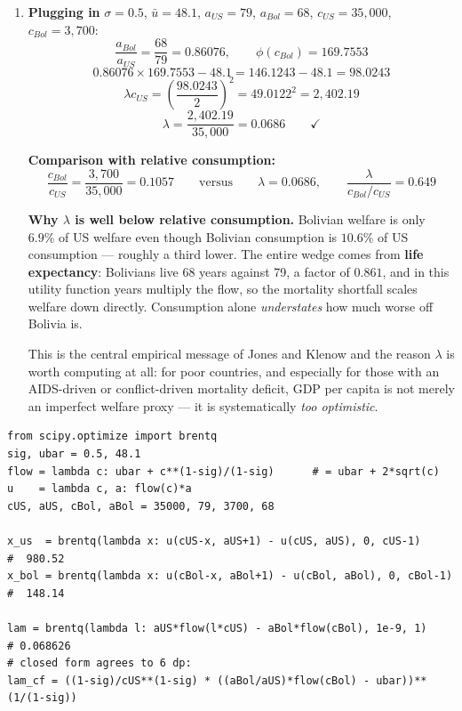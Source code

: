 \documentclass[12pt, letterpaper]{article}
\begin{document}
\begin{tcolorbox}[evenbox,title={Problem 2.6 \quad The Value of Life Expectancy}]
\begin{enumerate}
\item \textbf{Plugging in} $\sigma = 0.5$, $\bar u = 48.1$, $a_{US}=79$, $a_{Bol}=68$,
$c_{US}=35{,}000$, $c_{Bol}=3{,}700$:
$$\frac{a_{Bol}}{a_{US}} = \frac{68}{79} = 0.86076, \qquad \phi(c_{Bol}) = 169.7553$$
$$0.86076 \times 169.7553 - 48.1 = 146.1243 - 48.1 = 98.0243$$
$$\lambda c_{US} = \left(\frac{98.0243}{2}\right)^{2} = 49.0122^2 = 2{,}402.19$$
$$\boxed{\lambda = \frac{2{,}402.19}{35{,}000} = 0.0686} \qquad \checkmark$$

\textbf{Comparison with relative consumption:}
$$\frac{c_{Bol}}{c_{US}} = \frac{3{,}700}{35{,}000} = 0.1057
\qquad\text{versus}\qquad \lambda = 0.0686, \qquad
\frac{\lambda}{c_{Bol}/c_{US}} = 0.649$$

\textbf{Why $\lambda$ is well below relative consumption.} Bolivian welfare is only $6.9\%$
of US welfare even though Bolivian consumption is $10.6\%$ of US consumption --- roughly a
third lower. The entire wedge comes from \textbf{life expectancy}: Bolivians live 68 years
against 79, a factor of $0.861$, and in this utility function years multiply the flow, so the
mortality shortfall scales welfare down directly. Consumption alone \emph{understates} how
much worse off Bolivia is.

This is the central empirical message of Jones and Klenow and the reason $\lambda$ is worth
computing at all: for poor countries, and especially for those with an AIDS-driven or
conflict-driven mortality deficit, GDP per capita is not merely an imperfect welfare proxy
--- it is systematically \emph{too optimistic}.

\end{enumerate}

\begin{tcolorbox}[theorybox,title={Verification code (executed)}]
\footnotesize
\begin{verbatim}
from scipy.optimize import brentq
sig, ubar = 0.5, 48.1
flow = lambda c: ubar + c**(1-sig)/(1-sig)      # = ubar + 2*sqrt(c)
u    = lambda c, a: flow(c)*a
cUS, aUS, cBol, aBol = 35000, 79, 3700, 68

x_us  = brentq(lambda x: u(cUS-x, aUS+1) - u(cUS, aUS), 0, cUS-1)      #  980.52
x_bol = brentq(lambda x: u(cBol-x, aBol+1) - u(cBol, aBol), 0, cBol-1) #  148.14

lam = brentq(lambda l: aUS*flow(l*cUS) - aBol*flow(cBol), 1e-9, 1)     # 0.068626
# closed form agrees to 6 dp:
lam_cf = ((1-sig)/cUS**(1-sig) * ((aBol/aUS)*flow(cBol) - ubar))**(1/(1-sig))
\end{verbatim}
\end{tcolorbox}
\end{tcolorbox}
\end{document}
